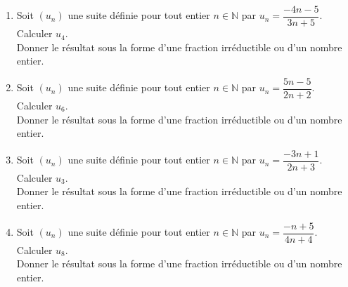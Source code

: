 \documentclass[11pt]{article}
\begin{document}
\begin{exercice}
\begin{enumerate}
	\item Soit $(u_n)$ une suite définie pour tout entier $n\in\mathbb{N}$ par 
          $u_n =\dfrac{-4n-5}{3n+5} $.\\Calculer $u_{4}$. \\
          Donner le résultat sous la forme d'une fraction irréductible ou d'un nombre entier.
	\item Soit $(u_n)$ une suite définie pour tout entier $n\in\mathbb{N}$ par 
          $u_n =\dfrac{5n-5}{2n+2} $.\\Calculer $u_{6}$. \\
          Donner le résultat sous la forme d'une fraction irréductible ou d'un nombre entier.
	\item Soit $(u_n)$ une suite définie pour tout entier $n\in\mathbb{N}$ par 
          $u_n =\dfrac{-3n+1}{2n+3} $.\\Calculer $u_{3}$. \\
          Donner le résultat sous la forme d'une fraction irréductible ou d'un nombre entier.
	\item Soit $(u_n)$ une suite définie pour tout entier $n\in\mathbb{N}$ par 
          $u_n =\dfrac{-n+5}{4n+4} $.\\Calculer $u_{8}$. \\
          Donner le résultat sous la forme d'une fraction irréductible ou d'un nombre entier.
\end{enumerate}
\end{exercice}
\end{document}
